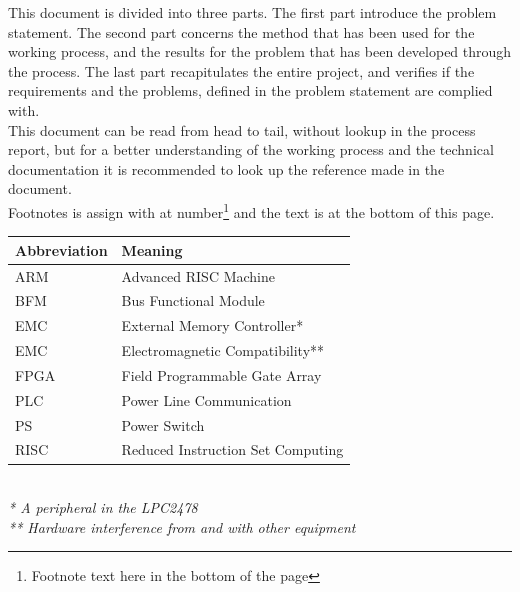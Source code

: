 This document is divided into three parts. The first part introduce the problem statement. The second part concerns the method that has been used for the working process, and the results for the problem that has been developed through the process. The last part recapitulates the entire project, and verifies if the requirements and the problems, defined in the problem statement are complied with.\\
This document can be read from head to tail, without lookup in the process report, but for a better understanding of the working process and the technical documentation it is recommended to look up the reference made in the document.\\
Footnotes is assign with at number\footnote{Footnote text here in the bottom of the page} and the text is at the bottom of this page.
\begin{table}[H]
    \begin{tabular}{|l|l|}
        \hline
        \textbf{Abbreviation} & \textbf{Meaning} \\ \hline
        ARM		& Advanced RISC Machine \\ \hline
        BFM		& Bus Functional Module \\ \hline
        EMC		& External Memory Controller* \\ \hline
        EMC		& Electromagnetic Compatibility** \\ \hline
        FPGA	& Field Programmable Gate Array \\ \hline
        PLC		& Power Line Communication \\ \hline
        PS		& Power Switch \\ \hline
        RISC	& Reduced Instruction Set Computing \\
        \hline
    \end{tabular}\\
\textit{* A peripheral in the LPC2478}\\
\textit{** Hardware interference from and with other equipment}\\
\end{table}
